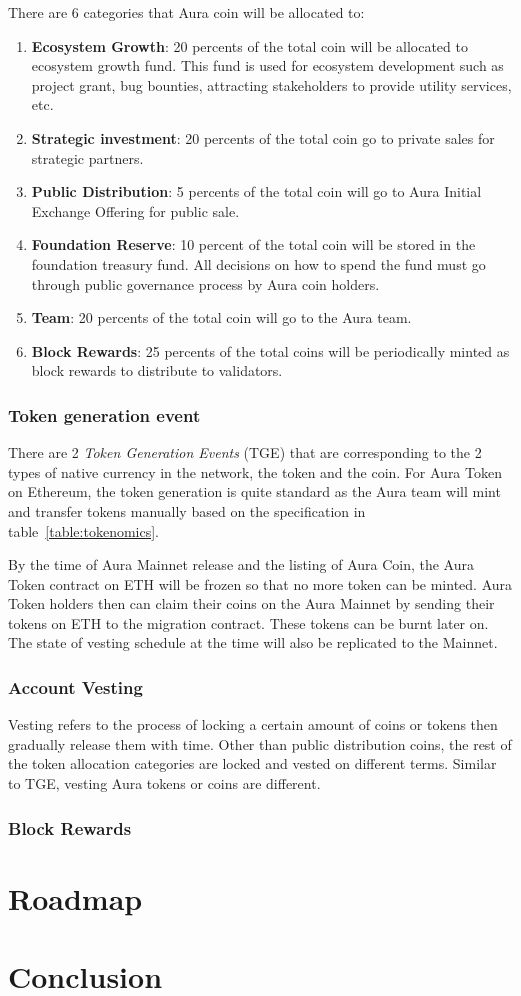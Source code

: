 \documentclass[12pt]{article}
\begin{document}
There are 6 categories that Aura coin will be allocated to:
\begin{enumerate}
    \item \textbf{Ecosystem Growth}: 20 percents of the total coin will be allocated to ecosystem growth fund. This fund is used for ecosystem development such as project grant, bug bounties, attracting stakeholders to provide utility services, etc. 
    \item \textbf{Strategic investment}: 20 percents of the total coin go to private sales for strategic partners.
    \item \textbf{Public Distribution}: 5 percents of the total coin will go to Aura Initial Exchange Offering for public sale.
    \item \textbf{Foundation Reserve}: 10 percent of the total coin will be stored in the foundation treasury fund. All decisions on how to spend the fund must go through public governance process by Aura coin holders. 
    \item \textbf{Team}: 20 percents of the total coin will go to the Aura team.
    \item \textbf{Block Rewards}: 25 percents of the total coins will be periodically minted as block rewards to distribute to validators.
\end{enumerate}

\subsubsection{Token generation event}
There are 2 \emph{Token Generation Events} (TGE) that are corresponding to the 2 types of native currency in the network, the token and the coin. For Aura Token on Ethereum, the token generation is quite standard as the Aura team will mint and transfer tokens manually based on the specification in table~\ref{table:tokenomics}.

By the time of Aura Mainnet release and the listing of Aura Coin, the Aura Token contract on ETH will be frozen so that no more token can be minted. Aura Token holders then can claim their coins on the Aura Mainnet by sending their tokens on ETH to the migration contract. These tokens can be burnt later on. The state of vesting schedule at the time will also be replicated to the Mainnet. 

\subsubsection{Account Vesting}
Vesting refers to the process of locking a certain amount of coins or tokens then gradually release them with time. Other than public distribution coins, the rest of the token allocation categories are locked and vested on different terms. Similar to TGE, vesting Aura tokens or coins are different.


\subsubsection{Block Rewards}

\section{Roadmap}

\section{Conclusion}



\end{document}
